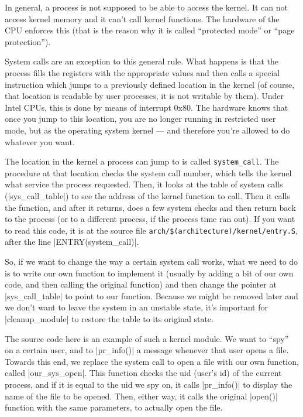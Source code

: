 \documentclass[10pt, oneside]{book}
\begin{document}
In general, a process is not supposed to be able to access the kernel.
It can not access kernel memory and it can't call kernel functions.
The hardware of the CPU enforces this (that is the reason why it is called ``protected mode'' or ``page protection'').

System calls are an exception to this general rule.
What happens is that the process fills the registers with the appropriate values and then calls a special instruction which jumps to a previously defined location in the kernel (of course, that location is readable by user processes, it is not writable by them).
Under Intel CPUs, this is done by means of interrupt 0x80. The hardware knows that once you jump to this location, you are no longer running in restricted user mode, but as the operating system kernel --- and therefore you're allowed to do whatever you want.

The location in the kernel a process can jump to is called \verb|system_call|.
The procedure at that location checks the system call number, which tells the kernel what service the process requested.
Then, it looks at the table of system calls (\cpp|sys_call_table|) to see the address of the kernel function to call.
Then it calls the function, and after it returns, does a few system checks and then return back to the process (or to a different process, if the process time ran out).
If you want to read this code, it is at the source file \verb|arch/$(architecture)/kernel/entry.S|, after the line \cpp|ENTRY(system_call)|.

So, if we want to change the way a certain system call works, what we need to do is to write our own function to implement it (usually by adding a bit of our own code, and then calling the original function) and then change the pointer at \cpp|sys_call_table| to point to our function.
Because we might be removed later and we don't want to leave the system in an unstable state, it's important for \cpp|cleanup_module| to restore the table to its original state.

The source code here is an example of such a kernel module.
We want to ``spy'' on a certain user, and to \cpp|pr_info()| a message whenever that user opens a file.
Towards this end, we replace the system call to open a file with our own function, called \cpp|our_sys_open|.
This function checks the uid (user's id) of the current process, and if it is equal to the uid we spy on, it calls \cpp|pr_info()| to display the name of the file to be opened.
Then, either way, it calls the original \cpp|open()| function with the same parameters, to actually open the file.
\end{document}
